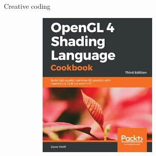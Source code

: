 \begin{frame}{Creative coding}
\begin{figure}[htp]
\begin{subfigure}[b]{0.12\textwidth}
   \includegraphics[width=\textwidth]{img/shaderBook}
 \end{subfigure}
\end{figure}
\end{frame}
